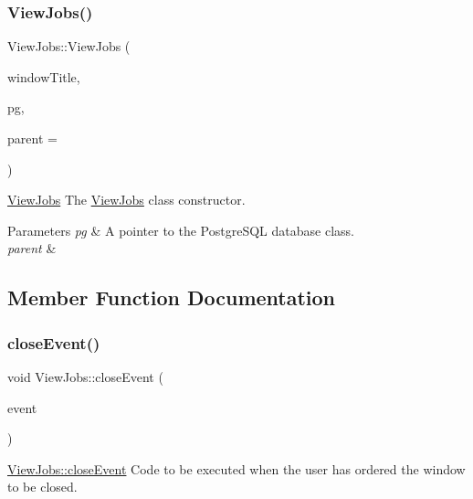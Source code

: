 \subsubsection{\texorpdfstring{View\+Jobs()}{ViewJobs()}}
{\footnotesize\ttfamily View\+Jobs\+::\+View\+Jobs (\begin{DoxyParamCaption}\item[{Q\+String}]{window\+Title,  }\item[{\hyperlink{classpsql}{psql} $\ast$}]{pg,  }\item[{Q\+Widget $\ast$}]{parent = {} }\end{DoxyParamCaption})\hspace{0.3cm}{\ttfamily [explicit]}}



\hyperlink{class_view_jobs}{View\+Jobs} The \hyperlink{class_view_jobs}{View\+Jobs} class constructor. 


\begin{DoxyParams}{Parameters}
{\em pg} & A pointer to the Postgre\+S\+QL database class. \\
\hline
{\em parent} & \\
\hline
\end{DoxyParams}


\subsection{Member Function Documentation}
\mbox{\label{class_view_jobs_a832503ca9eb4e4bf79c2fb48a59141aa}} 
\subsubsection{\texorpdfstring{close\+Event()}{closeEvent()}}
{\footnotesize\ttfamily void View\+Jobs\+::close\+Event (\begin{DoxyParamCaption}\item[{Q\+Close\+Event $\ast$}]{event }\end{DoxyParamCaption})\hspace{0.3cm}{\ttfamily [override]}}



\hyperlink{class_view_jobs_a832503ca9eb4e4bf79c2fb48a59141aa}{View\+Jobs\+::close\+Event} Code to be executed when the user has ordered the window to be closed. 


